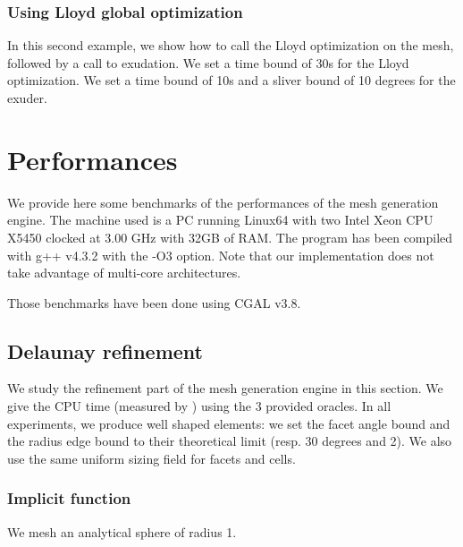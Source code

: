 

\subsubsection{Using Lloyd global optimization}

In this second example, we show how to call  the Lloyd optimization on the
mesh, followed by a call to exudation. We set a time bound of 30s for the Lloyd optimization. 
We set a time bound of 10s and a sliver bound of 10 degrees for the exuder.






\section{Performances}

We provide here some benchmarks of the performances of the mesh generation engine. The machine
used is a PC running Linux64 with two Intel Xeon CPU X5450 clocked at 3.00 GHz
with 32GB of RAM. The program has been compiled with g++ v4.3.2 with the -O3 option. 
Note that our implementation does not take advantage of multi-core
architectures.

Those benchmarks have been done using CGAL v3.8.

\subsection{Delaunay refinement}

We study the refinement part of the mesh generation engine in this section. We
give the CPU time (measured by ) using the 3 provided oracles. In all experiments, we produce well
shaped elements: we set the facet angle bound and the radius edge bound to their
theoretical limit (resp. 30 degrees and 2). We also use the same uniform sizing field for facets
and cells.

\subsubsection{Implicit function}

We mesh an analytical sphere of radius 1.

